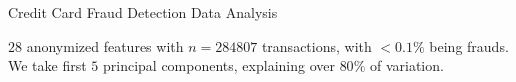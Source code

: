 \documentclass[10pt]{beamer}
\begin{document}
\begin{frame}{Credit Card Fraud Detection Data Analysis}

{
    \small $28$ anonymized features with $n = 284807$ transactions, with $<0.1\%$ being frauds. We take first $5$ principal components, explaining over $80\%$ of variation.
}

\begin{columns}
    \hfill
\end{columns}
\end{frame}
\end{document}
